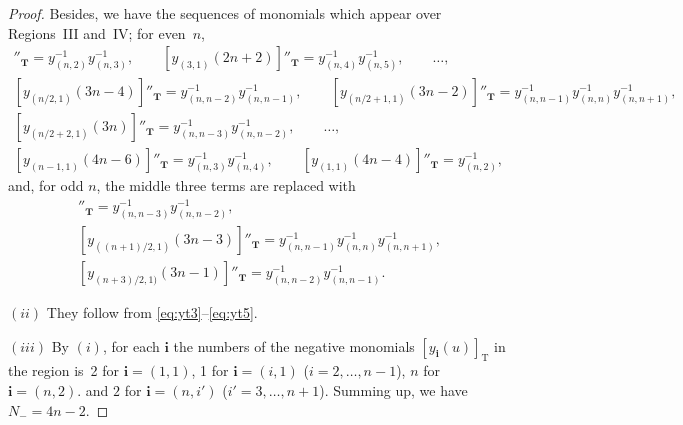 \documentclass[11pt]{article}
\numberwithin{equation}{section}
\theoremstyle{definition}
\begin{document}
\begin{proof}
Besides, we have the sequences of  monomials
which appear over Regions~III and~IV;
for even~$n$,
\begin{gather}
 [y_{(2,1)}(2n)]''_{\mathbf{T}}=y_{(n,2)}^{-1}y_{(n,3)}^{-1},
\qquad [y_{(3,1)}(2n+2)]''_{\mathbf{T}}=y_{(n,4)}^{-1}y_{(n,5)}^{-1},
\qquad \dots,\nonumber\\
 [y_{(n/2,1)}(3n-4)]''_{\mathbf{T}}=y_{(n,n-2)}^{-1}y_{(n,n-1)}^{-1},\qquad
 [y_{(n/2+1,1)}(3n-2)]''_{\mathbf{T}}=y_{(n,n-1)}^{-1}y_{(n,n)}^{-1}y_{(n,n+1)}^{-1},\nonumber\\
 [y_{(n/2+2,1)}(3n)]''_{\mathbf{T}}=y_{(n,n-3)}^{-1}y_{(n,n-2)}^{-1},\qquad
\dots,\nonumber\\
  [y_{(n-1,1)}(4n-6)]''_{\mathbf{T}}=y_{(n,3)}^{-1}y_{(n,4)}^{-1},
\qquad [y_{(1,1)}(4n-4)]''_{\mathbf{T}}=y_{(n,2)}^{-1},\label{eq:yt2}
\end{gather}
and, for odd $n$, the middle three terms are replaced with
\begin{gather}
 [y_{((n-1)/2,1)}(3n-5)]''_{\mathbf{T}}=y_{(n,n-3)}^{-1}y_{(n,n-2)}^{-1},\nonumber\\
 [y_{((n+1)/2,1)}(3n-3)]''_{\mathbf{T}}=
y_{(n,n-1)}^{-1}y_{(n,n)}^{-1}y_{(n,n+1)}^{-1},\nonumber\\
 [y_{(n+3)/2,1)}(3n-1)]''_{\mathbf{T}}=y_{(n,n-2)}^{-1}y_{(n,n-1)}^{-1}.\label{eq:yt5}
\end{gather}

$(ii)$ They  follow from
\eqref{eq:yt3}--\eqref{eq:yt5}.


$(iii)$ By $(i)$, for each  $\mathbf{i}$
the numbers of the negative monomials
$[y_{\mathbf{i}}(u)]_{\mathrm{T}}$
in the region is~2 for $\mathbf{i}= (1,1)$,
 1 for $\mathbf{i}= (i,1)$ ($i=2,\dots,n-1$),
$n$ for $\mathbf{i}= (n,2)$.
and $2$ for $\mathbf{i}=(n,i')$ ($i'=3,\dots,n+1$).
Summing up, we have $N_-=4n-2$.
\end{proof}
\end{document}
